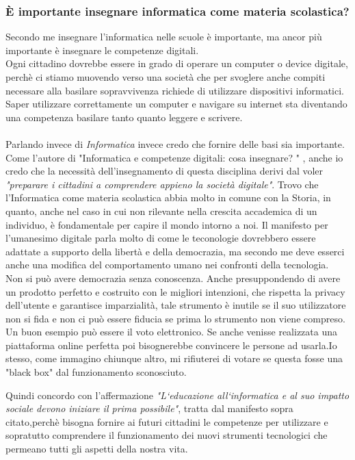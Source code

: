 \documentclass[a4paper]{article}
\begin{document}
\subsubsection{È importante insegnare informatica come materia scolastica?}
Secondo me insegnare l'informatica nelle scuole è importante, ma ancor più importante è insegnare le competenze digitali.\\
Ogni cittadino dovrebbe essere in grado di operare un computer o device digitale, perchè ci stiamo muovendo verso una società che per svoglere anche compiti necessare alla basilare sopravvivenza richiede di utilizzare dispositivi informatici. Saper utilizzare correttamente un computer e navigare su internet sta diventando una competenza basilare tanto quanto leggere e scrivere.\\
\\
Parlando invece di \emph{Informatica} invece credo che fornire delle basi sia importante.\\
Come l'autore di "Informatica e competenze digitali: cosa insegnare? "\cite{insegnare} , anche io credo che la necessità dell'insegnamento di questa disciplina derivi dal voler \emph{"preparare i cittadini a comprendere appieno la società digitale"}.
Trovo che l'Informatica come materia scolastica abbia molto in comune con la Storia, in quanto, anche nel caso in cui non rilevante nella crescita accademica di un individuo, è fondamentale per capire il mondo intorno a noi. Il manifesto per l'umanesimo digitale\cite{umanesimo} parla molto di come le teconologie dovrebbero essere adattate a supporto della libertà e della democrazia, ma secondo me deve esserci anche una modifica del comportamento umano nei confronti della tecnologia.\\
Non si può avere democrazia senza conoscenza. Anche presuppondendo di avere un prodotto perfetto e costruito con le migliori intenzioni, che rispetta la privacy dell'utente e garantisce imparzialità, tale strumento è inutile se il suo utilizzatore non si fida e non ci può essere fiducia se prima lo strumento non viene compreso.
Un buon esempio può essere il voto elettronico. Se anche venisse realizzata una piattaforma online perfetta poi bisognerebbe convincere le persone ad usarla.Io stesso, come immagino chiunque altro, mi rifiuterei di votare se questa fosse una "black box" dal funzionamento sconosciuto.

Quindi concordo con l'affermazione \emph{"L‘educazione all‘informatica e al suo impatto sociale devono iniziare il prima possibile"}, tratta dal manifesto sopra citato,perchè bisogna fornire ai futuri cittadini le competenze per utilizzare e sopratutto comprendere il funzionamento dei nuovi strumenti tecnologici che permeano tutti gli aspetti della nostra vita.
\end{document}
